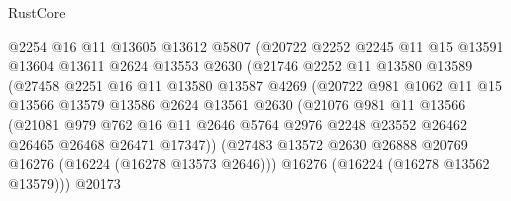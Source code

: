 \begin{lexlean}{RustCore}
\begin{coremodule}
                        @2254
                        @16
                        @11
                        @13605
                        @13612
                        @5807
                        (@20722
                          @2252
                          @2245
                          @11
                          @15
                          @13591
                          @13604
                          @13611
                          @2624
                          @13553
                          @2630
                          (@21746
                            @2252
                            @11
                            @13580
                            @13589
                            (@27458
                              @2251
                              @16
                              @11
                              @13580
                              @13587
                              @4269
                              (@20722
                                @981
                                @1062
                                @11
                                @15
                                @13566
                                @13579
                                @13586
                                @2624
                                @13561
                                @2630
                                (@21076
                                  @981
                                  @11
                                  @13566
                                  (@21081
                                    @979
                                    @762
                                    @16
                                    @11
                                    @2646
                                    @5764
                                    @2976
                                    @2248
                                    @23552
                                    @26462
                                    @26465
                                    @26468
                                    @26471
                                    @17347))
                                (@27483
                                  @13572
                                  @2630
                                  @26888
                                  @20769
                                  @16276
                                  (@16224 (@16278 @13573 @2646)))
                                @16276
                                (@16224 (@16278 @13562 @13579)))
                              @20173

\end{coremodule}
\end{lexlean}
